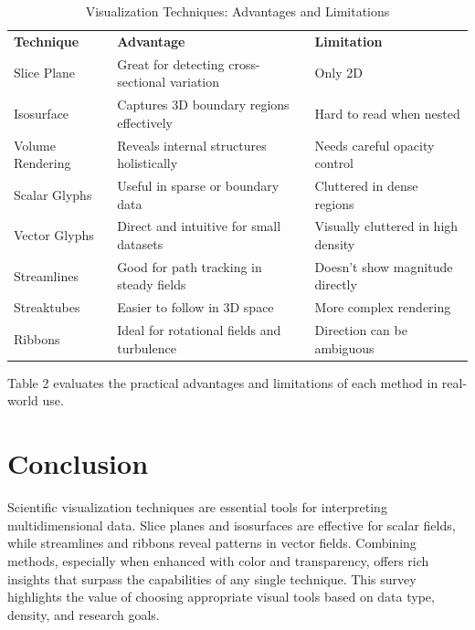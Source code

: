 \documentclass[11pt]{article}
\begin{document}
\begin{table}[H]
	\centering
	\caption{Visualization Techniques: Advantages and Limitations}
	\renewcommand{\arraystretch}{1.3}
	\begin{tabular}{|l|l|l|}
		\hline
		\textbf{Technique} & \textbf{Advantage}                            & \textbf{Limitation}                \\
		
		Slice Plane        & Great for detecting cross-sectional variation & Only 2D                            \\
		
		Isosurface         & Captures 3D boundary regions effectively      & Hard to read when nested           \\
		
		Volume Rendering   & Reveals internal structures holistically      & Needs careful opacity control      \\
		
		Scalar Glyphs      & Useful in sparse or boundary data             & Cluttered in dense regions         \\
		
		Vector Glyphs      & Direct and intuitive for small datasets       & Visually cluttered in high density \\
		
		Streamlines        & Good for path tracking in steady fields       & Doesn't show magnitude directly    \\
		
		Streaktubes        & Easier to follow in 3D space                  & More complex rendering             \\
		
		Ribbons            & Ideal for rotational fields and turbulence    & Direction can be ambiguous         \\
		\hline
	\end{tabular}
\end{table}
	
\noindent Table 2 evaluates the practical advantages and limitations of each method in real-world use.
	
\section{Conclusion}
Scientific visualization techniques are essential tools for interpreting multidimensional data. Slice planes and isosurfaces are effective for scalar fields, while streamlines and ribbons reveal patterns in vector fields. Combining methods, especially when enhanced with color and transparency, offers rich insights that surpass the capabilities of any single technique. This survey highlights the value of choosing appropriate visual tools based on data type, density, and research goals.
	
\end{document}
